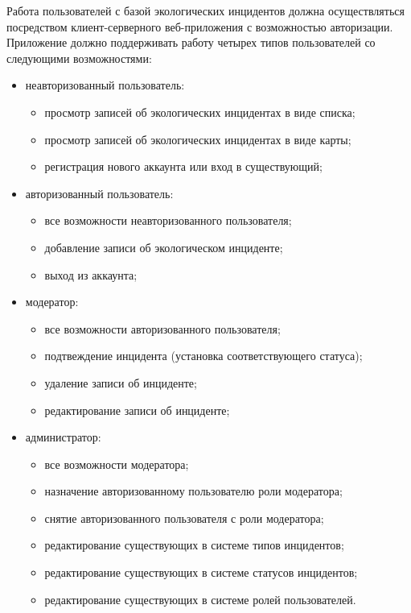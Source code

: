 Работа пользователей с базой экологических инцидентов должна осуществляться посредством клиент-серверного веб-приложения с возможностью авторизации. Приложение должно поддерживать работу четырех типов пользователей со следующими возможностями: 
\begin{itemize}
	\item неавторизованный пользователь:
	\begin{itemize}
		\item просмотр записей об экологических инцидентах в виде списка;
		\item просмотр записей об экологических инцидентах в виде карты;
		\item регистрация нового аккаунта или вход в существующий;
	\end{itemize}
	\item авторизованный пользователь:
	\begin{itemize}
		\item все возможности неавторизованного пользователя;
		\item добавление записи об экологическом инциденте;
		\item выход из аккаунта;
	\end{itemize}
	\item модератор:
	\begin{itemize}
		\item все возможности авторизованного пользователя;
		\item подтвеждение инцидента (установка соответствующего статуса);
		\item удаление записи об инциденте;
		\item редактирование записи об инциденте;
	\end{itemize}
	\item администратор:
	\begin{itemize}
		\item все возможности модератора;
		\item назначение авторизованному пользователю роли модератора;
		\item снятие авторизованного пользователя с роли модератора;
		\item редактирование существующих в системе типов инцидентов;
		\item редактирование существующих в системе статусов инцидентов; 
		\item редактирование существующих в системе ролей пользователей. 
	\end{itemize}
\end{itemize}


